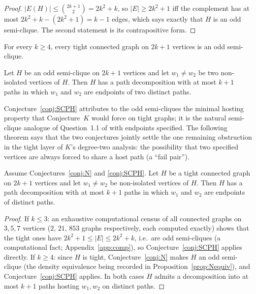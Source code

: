 \begin{proof}
$|E(H)|\le\binom{2k+1}{2}=2k^2+k$, so $|E|\ge2k^2+1$ iff the complement has at most
$2k^2+k-(2k^2+1)=k-1$ edges, which says exactly that $H$ is an odd semi-clique. The second
statement is its contrapositive form.
\end{proof}

\begin{conjecture}\label{conj:N}
For every $k\ge4$, every tight connected graph on $2k+1$ vertices is an odd semi-clique.
\end{conjecture}

\begin{conjecture}\label{conj:SCPH}
Let $H$ be an odd semi-clique on $2k+1$ vertices and let $w_1\ne w_2$ be two non-isolated
vertices of $H$. Then $H$ has a path decomposition with at most $k+1$ paths in which $w_1$ and
$w_2$ are endpoints of two distinct paths.
\end{conjecture}

Conjecture~\ref{conj:SCPH} attributes to the odd semi-cliques the minimal hosting property that
Conjecture~$K$ would force on tight graphs; it is the natural semi-clique analogue of
Question~1.1 of \cite{BP19} with endpoints specified. The following theorem says that the two
conjectures jointly settle the one remaining obstruction in the tight layer of $K$'s
degree-two analysis: the possibility that two specified vertices are always forced to share a
host path (a ``fail pair'').

\begin{theorem}\label{thm:reduction}
Assume Conjectures~\ref{conj:N} and \ref{conj:SCPH}. Let $H$ be a tight connected graph on
$2k+1$ vertices and let $w_1\ne w_2$ be non-isolated vertices of $H$. Then $H$ has a path
decomposition with at most $k+1$ paths in which $w_1$ and $w_2$ are endpoints of distinct
paths.
\end{theorem}

\begin{proof}
If $k\le3$: an exhaustive computational census of all connected graphs on $3,5,7$ vertices ($2$, $21$, $853$
graphs respectively, each computed exactly) shows that the tight ones have $2k^2+1\le|E|\le2k^2+k$,
i.e.\ are odd semi-cliques (a computational fact; Appendix~\ref{app:comp}), so Conjecture~\ref{conj:SCPH} applies
directly. If $k\ge4$: since $H$ is tight, Conjecture~\ref{conj:N} makes $H$ an odd
semi-clique (the density equivalence being recorded in
Proposition~\ref{prop:Nequiv}), and Conjecture~\ref{conj:SCPH} applies. In both cases $H$ admits a decomposition
into at most $k+1$ paths hosting $w_1,w_2$ on distinct paths.
\end{proof}

